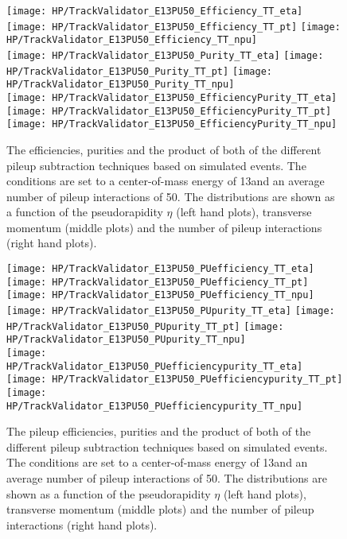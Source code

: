 \begin{figure}[!h]
  \centering
  \texttt{[image: HP/TrackValidator\_E13PU50\_Efficiency\_TT\_eta]}
  \texttt{[image: HP/TrackValidator\_E13PU50\_Efficiency\_TT\_pt]}
  \texttt{[image: HP/TrackValidator\_E13PU50\_Efficiency\_TT\_npu]}
   \\
  \texttt{[image: HP/TrackValidator\_E13PU50\_Purity\_TT\_eta]}
  \texttt{[image: HP/TrackValidator\_E13PU50\_Purity\_TT\_pt]}
  \texttt{[image: HP/TrackValidator\_E13PU50\_Purity\_TT\_npu]}
   \\
  \texttt{[image: HP/TrackValidator\_E13PU50\_EfficiencyPurity\_TT\_eta]}
  \texttt{[image: HP/TrackValidator\_E13PU50\_EfficiencyPurity\_TT\_pt]}
  \texttt{[image: HP/TrackValidator\_E13PU50\_EfficiencyPurity\_TT\_npu]}
  \caption[Efficiencies, purities and their product of the different pileup subtraction techniques based on simulated \ttbar events with 13\TeV and $\left<PU\right>=50$]{The efficiencies, purities and the product of both of the different pileup subtraction techniques based on simulated \ttbar events. The conditions are set to a center-of-mass energy of 13\TeV and an average number of pileup interactions of 50. The distributions are shown as a function of the pseudorapidity $\eta$ (left hand plots), transverse momentum (middle plots) and the number of pileup interactions (right hand plots).}
\end{figure}
\clearpage

\begin{figure}[!h]
  \centering
  \texttt{[image: HP/TrackValidator\_E13PU50\_PUefficiency\_TT\_eta]}
  \texttt{[image: HP/TrackValidator\_E13PU50\_PUefficiency\_TT\_pt]}
  \texttt{[image: HP/TrackValidator\_E13PU50\_PUefficiency\_TT\_npu]}
   \\
  \texttt{[image: HP/TrackValidator\_E13PU50\_PUpurity\_TT\_eta]}
  \texttt{[image: HP/TrackValidator\_E13PU50\_PUpurity\_TT\_pt]}
  \texttt{[image: HP/TrackValidator\_E13PU50\_PUpurity\_TT\_npu]}
   \\
  \texttt{[image: HP/TrackValidator\_E13PU50\_PUefficiencypurity\_TT\_eta]}
  \texttt{[image: HP/TrackValidator\_E13PU50\_PUefficiencypurity\_TT\_pt]}
  \texttt{[image: HP/TrackValidator\_E13PU50\_PUefficiencypurity\_TT\_npu]}
  \caption[Pileup efficiencies, purities and their product of the different pileup subtraction techniques based on simulated \ttbar events with 13\TeV and $\left<PU\right>=50$]{The pileup efficiencies, purities and the product of both of the different pileup subtraction techniques based on simulated \ttbar events. The conditions are set to a center-of-mass energy of 13\TeV and an average number of pileup interactions of 50. The distributions are shown as a function of the pseudorapidity $\eta$ (left hand plots), transverse momentum (middle plots) and the number of pileup interactions (right hand plots).}
\end{figure}
\clearpage

